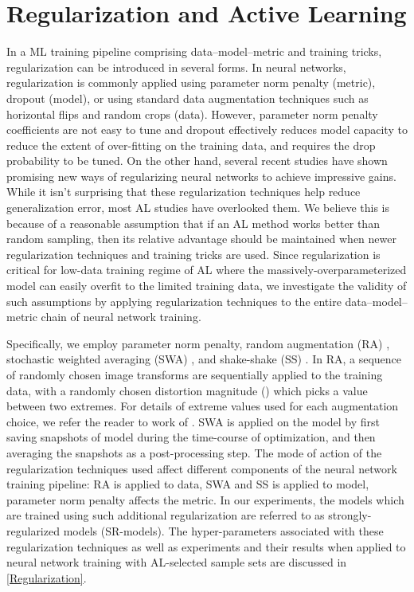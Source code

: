 \documentclass[10pt,twocolumn,letterpaper]{article}
\begin{document}
\section{Regularization and Active Learning}\label{sec:regularization_section}
In a ML training pipeline comprising data--model--metric and training tricks, regularization can be introduced in several forms. In neural networks, regularization is commonly applied using parameter norm penalty (metric), dropout (model), or using standard data augmentation techniques such as horizontal flips and random crops (data). However, parameter norm penalty coefficients are not easy to tune and dropout effectively reduces model capacity to reduce the extent of over-fitting on the training data, and requires the drop probability to be tuned. On the other hand, several recent studies have shown promising new ways of regularizing neural networks to achieve impressive gains. While it isn't surprising that these regularization techniques help reduce generalization error, most AL studies have overlooked them. We believe this is because of a reasonable assumption that if an AL method works better than random sampling, then its relative advantage should be maintained when newer regularization techniques and training tricks are used. Since regularization is critical for low-data training regime of AL where the massively-overparameterized model can easily overfit to the limited training data, we investigate the validity of such assumptions by applying regularization techniques to the entire data--model--metric chain of neural network training.

Specifically, we employ parameter norm penalty, random augmentation (RA) \cite{cubuk2019randaugment}, stochastic weighted averaging (SWA) \cite{SWA_izmailov2018averaging}, and shake-shake (SS) \cite{shake-shake_gastaldi2017shake}. In RA, a sequence of  randomly chosen image transforms are sequentially applied to the training data, with a randomly chosen distortion magnitude () which picks a value between two extremes. For details of extreme values used for each augmentation choice, we refer the reader to work of \cite{cubuk2018autoaugment}. SWA is applied on the model by first saving  snapshots of model during the time-course of optimization, and then averaging the snapshots as a post-processing step. The mode of action of the regularization techniques used affect different components of the neural network training pipeline: RA is applied to data, SWA and SS is applied to model, parameter norm penalty affects the metric. In our experiments, the models which are trained using such additional regularization are referred to as strongly-regularized models (SR-models). The hyper-parameters associated with these regularization techniques as well as experiments and their results when applied to neural network training with AL-selected sample sets are discussed in \cref{Regularization}.
\end{document}
